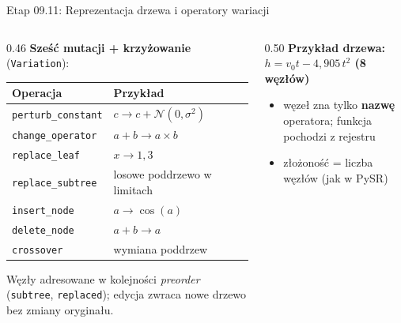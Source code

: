 \documentclass[
  polish,
  aspectratio=169,
]{beamer}
\begin{document}
\begin{frame}{Etap 09.11: Reprezentacja drzewa i operatory wariacji}
  \begin{columns}[T]
    \begin{column}{0.46\textwidth}
      {\small\textbf{Sześć mutacji + krzyżowanie} (\texttt{Variation}):}\par\smallskip
      \scriptsize
      \begin{tabular}{@{}ll@{}}
        \toprule
        Operacja & Przykład \\
        \midrule
        \texttt{perturb\_constant} & $c \to c + \mathcal{N}(0,\sigma^2)$ \\
        \texttt{change\_operator} & $a + b \to a \times b$ \\
        \texttt{replace\_leaf} & $x \to 1{,}3$ \\
        \texttt{replace\_subtree} & losowe poddrzewo w limitach \\
        \texttt{insert\_node} & $a \to \cos(a)$ \\
        \texttt{delete\_node} & $a + b \to a$ \\
        \texttt{crossover} & wymiana poddrzew \\
        \bottomrule
      \end{tabular}\par\medskip
      {\scriptsize\color{aghmuted}Węzły adresowane w kolejności \emph{preorder} (\texttt{subtree}, \texttt{replaced}); edycja zwraca nowe drzewo bez zmiany oryginału.}
    \end{column}
    \begin{column}{0.50\textwidth}
      \centering
      \textbf{Przykład drzewa: $h = v_0 t - 4{,}905\,t^2$ (8 węzłów)}\par\smallskip
      \par\medskip
      \begin{itemize}\footnotesize
        \item węzeł zna tylko \textbf{nazwę} operatora; funkcja pochodzi z rejestru
        \item złożoność = liczba węzłów (jak w PySR)
      \end{itemize}
    \end{column}
  \end{columns}
\end{frame}
\end{document}

